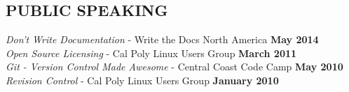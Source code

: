 \documentclass[margin,line]{resume}
\begin{document}
\begin{resume}
\sectionline

    \section{\mysidestyle \textbf{\large{P}\small{UBLIC SPEAKING}}}

    \textsl{Don't Write Documentation} - Write the Docs North America \hfill \textbf{May 2014}\\
    \textsl{Open Source Licensing} - Cal Poly Linux Users Group \hfill \textbf{March 2011}\\
    \textsl{Git - Version Control Made Awesome} - Central Coast Code Camp \hfill \textbf{May 2010}\\
    \textsl{Revision Control} - Cal Poly Linux Users Group \hfill \textbf{January 2010}\\


\end{resume}
\end{document}
